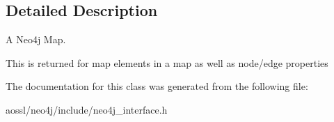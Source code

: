 \subsection{Detailed Description}
A Neo4j Map. 

This is returned for map elements in a map as well as node/edge properties 

The documentation for this class was generated from the following file\+:\begin{DoxyCompactItemize}
\item 
aossl/neo4j/include/neo4j\+\_\+interface.\+h\end{DoxyCompactItemize}
